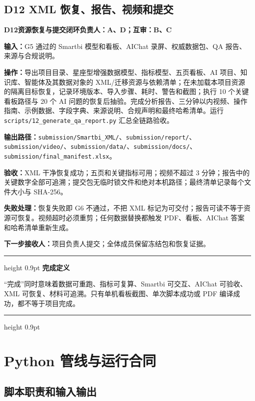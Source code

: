 \documentclass[UTF8,fontset=windows,12pt,openany]{ctexbook}
\newenvironment{gatebox}[1][]{%
  \par\medskip\noindent\begin{center}\begin{minipage}{0.93\textwidth}%
  \color{GoldLine}\hrule height 0.9pt\vspace{0.45em}%
  \textbf{#1}\par\smallskip\color{black}%
}{%
  \par\vspace{0.35em}\color{GoldLine}\hrule height 0.9pt%
  \end{minipage}\end{center}\medskip%
}
\newcommand{\File}[1]{{\small\nolinkurl{#1}}}
\newcommand{\StepTitle}[3]{%
  \noindent\colorbox{DeepNavy}{\parbox{0.965\textwidth}{\color{white}\Large\bfseries #1\quad #2\hfill\normalsize #3}}\par\medskip
}
\newcommand{\CardRow}[2]{\noindent\textbf{#1：}#2\par}
\begin{document}
\newpage
\section{D12 XML 恢复、报告、视频和提交}
\StepTitle{D12}{资源恢复与提交闭环}{负责人：A、D；互审：B、C}
\CardRow{输入}{G5 通过的 Smartbi 模型和看板、AIChat 录屏、权威数据包、QA 报告、来源与合规说明。}
\CardRow{操作}{导出项目目录、星座型增强数据模型、指标模型、五页看板、AI 项目、知识库、智能体及其数据对象的 XML/迁移资源与依赖清单；在未加载本项目资源的隔离目标恢复，记录环境版本、导入步骤、耗时、警告和截图；执行 10 个关键看板路径与 20 个 AI 问题的恢复后抽验。完成分析报告、三分钟以内视频、操作指南、示例数据、字段字典、来源说明、合规声明和最终哈希清单。运行 \File{scripts/12_generate_qa_report.py} 汇总全链路验收。}
\CardRow{输出路径}{\File{submission/Smartbi_XML/}、\File{submission/report/}、\File{submission/video/}、\File{submission/data/}、\File{submission/docs/}、\File{submission/final_manifest.xlsx}。}
\CardRow{验收}{XML 干净恢复成功；五页和关键指标可用；视频不超过 3 分钟；报告中的关键数字全部可追溯；提交包无临时锁文件和绝对本机路径；最终清单记录每个文件大小与 SHA-256。}
\CardRow{失败处理}{恢复失败即 G6 不通过，不把 XML 标记为可交付；报告可读不等于资源可恢复。视频超时必须重剪；任何数据替换都触发 PDF、看板、AIChat 答案和哈希清单重新生成。}
\CardRow{下一步接收人}{项目负责人提交；全体成员保留冻结包和恢复证据。}

\begin{gatebox}[完成定义]
“完成”同时意味着数据可重跑、指标可复算、Smartbi 可交互、AIChat 可验收、XML 可恢复、材料可追溯。只有单机看板截图、单次脚本成功或 PDF 编译成功，都不等于项目完成。
\end{gatebox}

\chapter{Python 管线与运行合同}

\section{脚本职责和输入输出}
\end{document}

